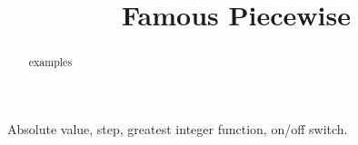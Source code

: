 \documentclass{ximera}
\title{Famous Piecewise}
\begin{document}
\begin{abstract}
examples
\end{abstract}
\maketitle



Absolute value, step, greatest integer function, on/off switch.
\end{document}
